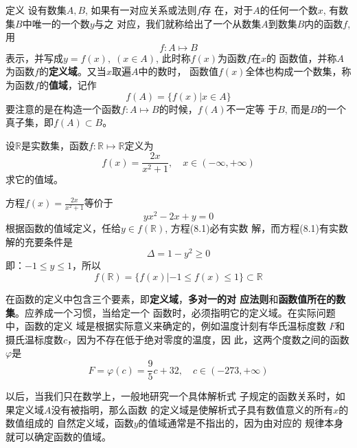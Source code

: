 \begin{blk}{定义}
     设有数集$A,B$, 如果有一对应关系或法则$f$存
在，对于$A$的任何一个数$x$, 有数集$B$中唯一的一个数$y$与之
对应，我们就称给出了一个从数集$A$到数集$B$内的函数$f$, 用
\[f:A\mapsto B\]
表示，并写成$y=f(x),\; (x\in A)$, 此时称$f(x)$为函数$f$在$x$的
函数值，并称$A$为函数$f$的\textbf{定义域}。又当$x$取遍$A$中的数时，
函数值$f(x)$全体也构成一个数集，称为函数$f$的\textbf{值域}，记作
\[f(A)=\{f(x)|x\in A\}\]
要注意的是在构造一个函数$f:A\mapsto B$的时候，$f(A)$不一定等
于$B$, 而是$B$的一个真子集，即$f(A)\subset B$。
\end{blk}



\begin{example}
设$\mathbb{R}$是实数集，函数$f:\mathbb{R}\mapsto\mathbb{R}$定义为
\[f(x)=\frac{2x}{x^2+1},\quad x\in(-\infty,+\infty)\]
求它的值域。
\end{example}

\begin{solution}
    方程$f(x)=\frac{2x}{x^2+1}$等价于
    \begin{equation}
        yx^2-2x+y=0
    \end{equation}
根据函数的值域定义，任给$y\in f(\mathbb{R})$, 方程(8.1)必有实数
解，而方程(8.1)有实数解的充要条件是
\[\Delta=1-y^2\ge 0\]
即：$-1\le y\le 1$，所以
\[f(\mathbb{R})=\{f(x)|-1\le f(x)\le 1\}\subset \mathbb{R}\]
\end{solution}

在函数的定义中包含三个要素，即\textbf{定义域}，\textbf{多对一的对
应法则}和\textbf{函数值所在的数集}。应养成一个习惯，当给定一个
函数时，必须指明它的定义域。在实际问题中，函数的定义
域是根据实际意义来确定的，例如温度计刻有华氏温标度数
$F$和摄氏温标度数$c$，因为不存在低于绝对零度的温度，因
此，这两个度数之间的函数$\varphi$是
\[F=\varphi(c)=\frac{9}{5}c+32,\quad c\in (-273,+\infty)\]

以后，当我们只在数学上，一般地研究一个具体解析式
子规定的函数关系时，如果定义域$A$没有被指明，那么函数
的定义域是使解析式子具有数值意义的所有$x$的数值组成的
自然定义域，函数$y$的值域通常是不指出的，因为由对应的
规律本身就可以确定函数的值域。










\begin{example}
    
\end{example}


